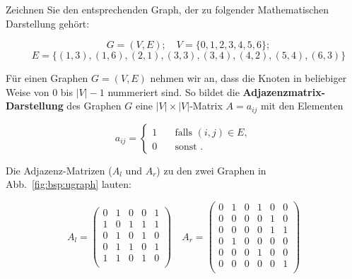 \begin{aufg}
Zeichnen Sie den entsprechenden Graph, der zu folgender Mathematischen Darstellung gehört:

\[ \quad G = (V, E); \quad V = \{0,1,2,3,4,5,6\}; \] 
\[\quad E =  \{ (1,3),(1,6), (2,1), (3,3), (3,4), (4,2), (5,4), (6,3)\} \]

\end{aufg}


\begin{mdef}
Für einen Graphen $G=(V,E)$ nehmen wir an, dass die Knoten in beliebiger Weise von 0 bis $|V|-1$ nummeriert sind.
So bildet die \textbf{Adjazenzmatrix-Darstellung} des Graphen $G$ eine $|V| \times |V|$-Matrix $A=a_{ij}$ mit den Elementen

\[ a_{ij} = 
  \begin{cases}
    1   & \quad \text{falls } (i,j) \in E, \\
   0   & \quad \text{sonst }.
  \end{cases}
\]
\end{mdef}

\begin{mbsp}
Die Adjazenz-Matrizen ($A_l$ und $A_r$) zu den zwei Graphen in Abb.~\ref{fig:bsp:ugraph} lauten:

\[ A_l =  \begin{pmatrix}
  0 & 1 & 0 & 0 & 1 \\
  1 & 0 & 1 & 1 & 1 \\
  0 & 1 & 0 & 1 & 0  \\
  0 & 1 & 1 & 0 & 1 \\
  1 & 1 & 0 & 1 & 0 \\
 \end{pmatrix}
\quad
A_r =  \begin{pmatrix}
  0 & 1 & 0 & 1 & 0 & 0 \\
  0 & 0 & 0 & 0 & 1 & 0 \\
  0 & 0 & 0 & 0 & 1 & 1 \\
  0 & 1 & 0 & 0 & 0 & 0 \\
  0 & 0 & 0 & 1 & 0 & 0 \\
  0 & 0 & 0 & 0 & 0 & 1 \\
 \end{pmatrix}
  \]
\end{mbsp}

